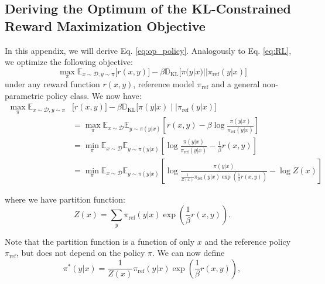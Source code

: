 \documentclass{article}
\newcommand{\piref}{\pi_\text{ref}}
\begin{document}
\subsection{Deriving the Optimum of the KL-Constrained Reward Maximization Objective}
In this appendix, we will derive Eq. \ref{eq:op_policy}. Analogously to Eq. \ref{eq:RL}, we optimize the following objective:
\begin{equation}
\max_{\pi}  \mathbb{E}_{x\sim \mathcal{D}, y\sim \pi}\bigl[r(x, y)\bigr] - \beta\mathbb{D}_{\textrm{KL}}\bigl[\pi(y|x)||\piref(y|x)\bigr]
\end{equation}
under any reward function $r(x,y)$, reference model $\piref$ and a general non-parametric policy class. We now have:
\begin{align}\label{eq:RL_proof}
\max_{\pi}  \mathbb{E}_{x\sim \mathcal{D}, y\sim \pi}&\bigl[r(x, y)\bigr] - \beta\mathbb{D}_{\textrm{KL}}\bigl[\pi(y|x)\mid\mid\piref(y|x)\bigr] \nonumber\\
&=\max_{\pi}  \mathbb{E}_{x\sim \mathcal{D}}\mathbb{E}_{y\sim \pi(y|x)}\left[r(x, y) - \beta\log\frac{\pi(y|x)}{\piref(y|x)}\right] \nonumber\\&=
\min_{\pi}  \mathbb{E}_{x\sim \mathcal{D}}\mathbb{E}_{y\sim \pi(y|x)}\left[\log\frac{\pi(y|x)}{\piref(y|x)} - \frac{1}{\beta}r(x, y)\right] \nonumber\\ &=
\min_{\pi}  \mathbb{E}_{x\sim \mathcal{D}}\mathbb{E}_{y\sim \pi(y|x)}\left[\log\frac{\pi(y|x)}{\frac{1}{Z(x)}\piref(y|x)\exp\left(\frac{1}{\beta}r(x, y)\right)} - \log Z(x)\right]
\end{align}

where we have partition function:
\begin{equation*}
Z(x) = \sum_{y}\piref(y|x)\exp\left(\frac{1}{\beta}r(x, y)\right).
\end{equation*}

Note that the partition function is a function of only $x$ and the reference policy $\piref$, but does not depend on the policy $\pi$. We can now define
\begin{equation*}
    \pi^*(y|x) = \frac{1}{Z(x)}\piref(y|x)\exp\left(\frac{1}{\beta}r(x, y)\right),
\end{equation*}
\end{document}
